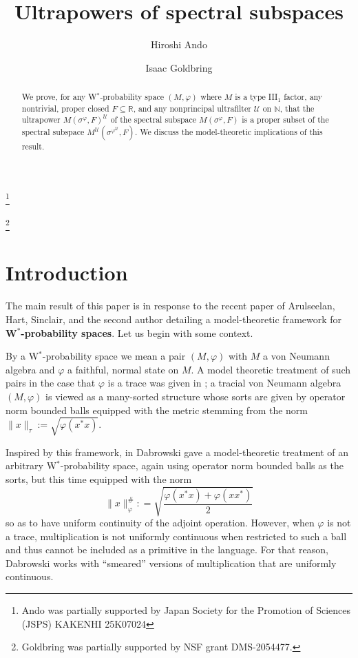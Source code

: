 \documentclass[12pt]{amsart}
\theoremstyle{definition}
\def\bb{\mathbb}
\def\bb{\mathbb}
\def\u{\mathsf 1}
\def \u{\mathcal U}
\begin{document}

\title{Ultrapowers of spectral subspaces}


\author{Hiroshi Ando}
\address{}
\thanks{Ando was partially supported by Japan Society for the Promotion of Sciences (JSPS) KAKENHI 25K07024}
\author{Isaac Goldbring}
\address{Department of Mathematics\\University of California, Irvine, 340 Rowland Hall (Bldg.\# 400),
Irvine, CA 92697-3875}
\thanks{Goldbring was partially supported by NSF grant DMS-2054477.}

\begin{abstract}
We prove, for any W$^*$-probability space $(M,\varphi)$ where $M$ is a type III$_1$ factor, any nontrivial, proper closed $F\subseteq \bb R$, and any nonprincipal ultrafilter $\u$ on $\bb N$, that the ultrapower $M(\sigma^\varphi,F)^\u$ of the spectral subspace $M(\sigma^\varphi,F)$ is a proper subset of the spectral subspace $M^\u(\sigma^{\varphi^\u},F)$.  We discuss the model-theoretic implications of this result.
\end{abstract}

\maketitle

\section{Introduction}

The main result of this paper is in response to the recent paper \cite{AGHS25} of Arulseelan, Hart, Sinclair, and the second author detailing a model-theoretic framework for \textbf{W$^*$-probability spaces}.  Let us begin with some context.

By a W$^*$-probability space we mean a pair $(M,\varphi)$ with $M$ a von Neumann algebra and $\varphi$ a faithful, normal state on $M$.  A model theoretic treatment of such pairs in the case that $\varphi$ is a trace was given in \cite{farah2014modelII}; a tracial von Neumann algebra $(M,\varphi)$ is viewed as a many-sorted structure whose sorts are given by operator norm bounded balls equipped with the metric stemming from the norm $\|x\|_\tau:=\sqrt{\varphi(x^*x)}$.  

Inspired by this framework, in \cite{dabrowski2019continuous} Dabrowski gave a model-theoretic treatment of an arbitrary W$^*$-probability space, again using operator norm bounded balls as the sorts, but this time equipped with the norm $$\|x\|_\varphi^\#: = \sqrt{\frac{\varphi(x^*x) + \varphi(xx^*)}{2}}$$ so as to have uniform continuity of the adjoint operation.  However, when $\varphi$ is not a trace, multiplication is not uniformly continuous when restricted to such a ball and thus cannot be included as a primitive in the language.  For that reason, Dabrowski works with ``smeared'' versions of multiplication that are uniformly continuous.
\end{document}
